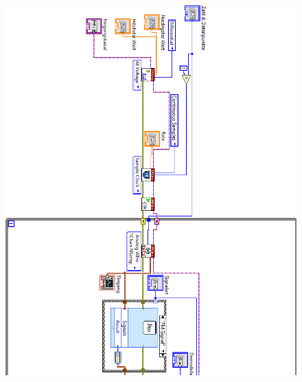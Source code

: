 	\newpage
	\pagestyle{empty}
	\begin{figure}[H]
		\centering
		\includegraphics[width=\textwidth]{pic/messstruktur_dafpm1.png}
	\end{figure} 
